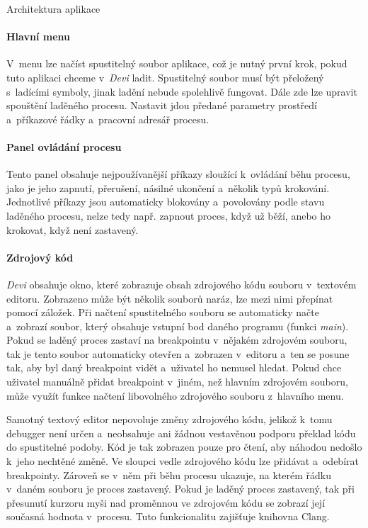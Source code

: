 \documentclass[czech,bachelor,male,python,dept460,hidelinks]{diploma}						%
\newcommand{\parspace}[1][]{
	\ifthenelse{\isempty{#1}}{\vspace{0mm}}{\vspace{#1}}
	\par
}
\begin{document}
\begin{section}{Architektura aplikace}
	
	\paragraph*{Hlavní menu} V~menu lze načíst spustitelný soubor aplikace, což je nutný první krok, pokud tuto aplikaci chceme v~\textit{Devi} ladit.
		Spustitelný soubor musí být přeložený s~ladícími symboly, jinak ladění nebude spolehlivě fungovat. Dále zde lze upravit spouštění laděného procesu.
		Nastavit jdou předané parametry prostředí a~příkazové řádky a~pracovní adresář procesu.
	\paragraph*{Panel ovládání procesu} Tento panel obsahuje nejpoužívanější příkazy sloužící k~ovládání běhu procesu, jako je jeho zapnutí, přerušení, násilné
		ukončení a~několik typů krokování. Jednotlivé příkazy jsou automaticky blokovány a~povolovány podle stavu laděného procesu, nelze tedy např. zapnout
		proces, když už běží, anebo ho krokovat, když není zastavený.
	\paragraph*{Zdrojový kód} \textit{Devi} obsahuje okno, které zobrazuje obsah zdrojového kódu souboru v~textovém editoru. Zobrazeno může být několik souborů naráz,
		lze mezi nimi přepínat pomocí záložek. Při načtení spustitelného souboru se automaticky načte a~zobrazí soubor, který obsahuje vstupní bod daného programu
		(funkci \textit{main}). Pokud se laděný proces zastaví na breakpointu v~nějakém zdrojovém souboru, tak je tento soubor automaticky otevřen a~zobrazen
		v~editoru a~ten se posune tak, aby byl daný breakpoint vidět a~uživatel ho nemusel hledat. Pokud chce uživatel manuálně přidat breakpoint v~jiném, než
		hlavním zdrojovém souboru, může využít funkce načtení libovolného zdrojového souboru z~hlavního menu.
		
		\parspace Samotný textový editor nepovoluje změny zdrojového kódu, jelikož k~tomu debugger není určen a~neobsahuje ani žádnou vestavěnou podporu překlad
		kódu do spustitelné podoby. Kód je tak zobrazen pouze pro čtení, aby náhodou nedošlo k~jeho nechtěné změně. Ve sloupci vedle zdrojového kódu lze přidávat
		a~odebírat breakpointy. Zároveň se v~něm při běhu procesu ukazuje, na kterém řádku v~daném souboru je proces zastavený. Pokud je laděný proces zastavený,
		tak při přesunutí kurzoru myši nad proměnnou ve zdrojovém kódu se zobrazí její současná hodnota v~procesu. Tuto funkcionalitu zajišťuje knihovna Clang.

\end{section}
\end{document}
